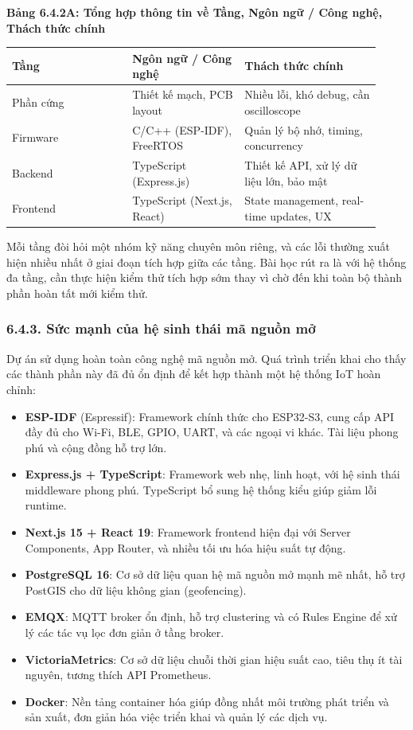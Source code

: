 \documentclass[13pt,a4paper]{extarticle}
\newcounter{none} %
\newcommand{\thesislongtableorignewline}{}
\let\thesislongtableorignewline\\
\renewcommand{\\}{\thesislongtableorignewline\hline}%
\let\\\thesislongtableorignewline
\newcommand{\thesistabletitle}[1]{%
  \begin{center}\textbf{#1}\end{center}%
}
\providecommand{\tightlist}{%
  \setlength{\itemsep}{0pt}\setlength{\parskip}{0pt}}
\begin{document}
{\def\LTcaptype{none} %
\thesistabletitle{Bảng 6.4.2A: Tổng hợp thông tin về Tầng, Ngôn ngữ / Công nghệ, Thách thức chính}

\begin{longtable}{|p{0.30\linewidth}|p{0.28\linewidth}|p{0.34\linewidth}|}
\hline \textbf{Tầng} & \textbf{Ngôn ngữ / Công nghệ} & \textbf{Thách thức chính} \\
\hline
\endhead
\hline
\endlastfoot
Phần cứng & Thiết kế mạch, PCB layout & Nhiều lỗi, khó debug, cần
oscilloscope \\
Firmware & C/C++ (ESP-IDF), FreeRTOS & Quản lý bộ nhớ, timing,
concurrency \\
Backend & TypeScript (Express.js) & Thiết kế API, xử lý dữ liệu lớn, bảo
mật \\
Frontend & TypeScript (Next.js, React) & State management, real-time
updates, UX \\
\end{longtable}
}

Mỗi tầng đòi hỏi một nhóm kỹ năng chuyên môn riêng, và các lỗi thường
xuất hiện nhiều nhất ở giai đoạn tích hợp giữa các tầng. Bài học rút ra
là với hệ thống đa tầng, cần thực hiện kiểm thử tích hợp sớm thay vì chờ
đến khi toàn bộ thành phần hoàn tất mới kiểm thử.

\subsubsection{6.4.3. Sức mạnh của hệ sinh thái mã nguồn
mở}\label{643-sux1ee9c-mux1ea1nh-cux1ee7a-hux1ec7-sinh-thuxe1i-muxe3-nguux1ed3n-mux1edf}

Dự án sử dụng hoàn toàn công nghệ mã nguồn mở. Quá trình triển khai cho
thấy các thành phần này đã đủ ổn định để kết hợp thành một hệ thống IoT
hoàn chỉnh:

\begin{itemize}
\tightlist
\item
  \textbf{ESP-IDF} (Espressif): Framework chính thức cho ESP32-S3, cung
  cấp API đầy đủ cho Wi-Fi, BLE, GPIO, UART, và các ngoại vi khác. Tài
  liệu phong phú và cộng đồng hỗ trợ lớn.
\item
  \textbf{Express.js + TypeScript}: Framework web nhẹ, linh hoạt, với hệ
  sinh thái middleware phong phú. TypeScript bổ sung hệ thống kiểu giúp
  giảm lỗi runtime.
\item
  \textbf{Next.js 15 + React 19}: Framework frontend hiện đại với Server
  Components, App Router, và nhiều tối ưu hóa hiệu suất tự động.
\item
  \textbf{PostgreSQL 16}: Cơ sở dữ liệu quan hệ mã nguồn mở mạnh mẽ
  nhất, hỗ trợ PostGIS cho dữ liệu không gian (geofencing).
\item
  \textbf{EMQX}: MQTT broker ổn định, hỗ trợ clustering và có Rules
  Engine để xử lý các tác vụ lọc đơn giản ở tầng broker.
\item
  \textbf{VictoriaMetrics}: Cơ sở dữ liệu chuỗi thời gian hiệu suất cao,
  tiêu thụ ít tài nguyên, tương thích API Prometheus.
\item
  \textbf{Docker}: Nền tảng container hóa giúp đồng nhất môi trường phát
  triển và sản xuất, đơn giản hóa việc triển khai và quản lý các dịch
  vụ.
\end{itemize}
\end{document}
